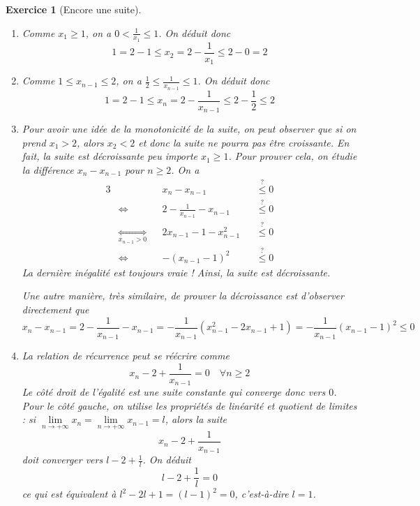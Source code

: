 \documentclass[11.5pt,french,table]{article}
\newcommand{\enumeratelinefix}{\leavevmode \vspace{-\baselineskip}} %
\theoremstyle{exercice}
\newtheorem{exercice}{Exercice}
\begin{document}
\begin{exercice}[Encore une suite]
\enumeratelinefix
\begin{enumerate}
    \item Comme $x_1 \geq 1$, on a $\displaystyle 0 < \frac{1}{x_1} \leq 1$. On déduit donc
    $$1 = 2 - 1 \leq x_2 = 2 - \frac{1}{x_1} \leq 2 - 0 = 2$$ 
    \item Comme $1 \leq x_{n-1} \leq 2$, on a $\displaystyle \frac{1}{2} \leq \frac{1}{x_{n-1}} \leq 1$. On déduit donc
    $$1 = 2 - 1 \leq x_n = 2 - \frac{1}{x_{n-1}} \leq 2 - \frac{1}{2} \leq 2$$ 
    \item Pour avoir une idée de la monotonicité de la suite, on peut observer que si on prend $x_1 > 2$, alors $x_2 < 2$ et donc la suite ne pourra pas être croissante. En fait, la suite est décroissante peu importe $x_1 \geq 1$. Pour prouver cela, on étudie la différence $x_{n} - x_{n-1}$ pour $n \geq 2$. On a
    \begin{alignat*}{3}
        &\phantom{\iff} &&x_n - x_{n-1} &&\overset{?}{\leq} 0 \\
        &\iff &&2 - \frac{1}{x_{n-1}} - x_{n-1} && \overset{?}{\leq} 0 \\
        &\underset{x_{n-1} > 0}{\iff}  &&2x_{n-1} -1 - x_{n-1}^2 && \overset{?}{\leq} 0 \\
        &\iff &&-(x_{n-1}-1)^2 && \overset{?}{\leq} 0
    \end{alignat*}
    La dernière inégalité est toujours vraie ! Ainsi, la suite est décroissante.
    
    Une autre manière, très similaire, de prouver la décroissance est d'observer directement que
    $$x_n - x_{n-1} = 2 - \frac{1}{x_{n-1}} - x_{n-1} = -\frac{1}{x_{n-1}}(x_{n-1}^2 - 2x_{n-1} + 1) = -\frac{1}{x_{n-1}}(x_{n-1}- 1)^2 \leq 0$$
    
    \item La relation de récurrence peut se réécrire comme
    $$x_n - 2 + \frac{1}{x_{n-1}} = 0 \quad \forall n \geq 2$$
    Le côté droit de l'égalité est une suite constante qui converge donc vers $0$. Pour le côté gauche, on utilise les propriétés de linéarité et quotient de limites : si $\displaystyle \lim \limits_{n \to +\infty} x_n = \lim \limits_{n \to +\infty} x_{n-1} = l$, alors la suite $$x_n - 2 + \frac{1}{x_{n-1}}$$
    doit converger vers $\displaystyle l - 2 + \frac{1}{l}$. On déduit
    $$l - 2 + \frac{1}{l} = 0$$
    ce qui est équivalent à $l^2 - 2l + 1 = (l - 1)^2 = 0$, c'est-à-dire $l = 1$.
\end{enumerate}
\end{exercice}
\end{document}
